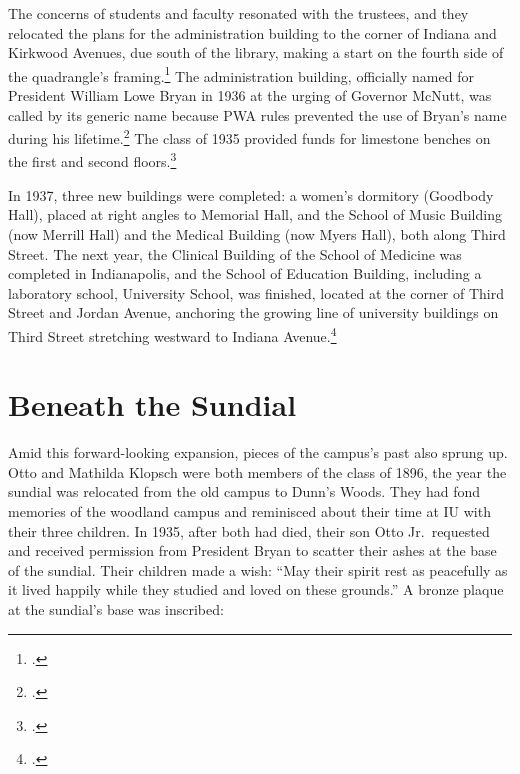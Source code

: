 \documentclass[
  american,
  letterpaper,
]{scrreprt}
\begin{document}
The concerns of students and faculty resonated with the trustees, and
they relocated the plans for the administration building to the corner
of Indiana and Kirkwood Avenues, due south of the library, making a
start on the fourth side of the quadrangle's framing.\footnote{.}
The administration building, officially named for President William Lowe
Bryan in 1936 at the urging of Governor McNutt, was called by its
generic name because PWA rules prevented the use of Bryan's name during
his lifetime.\footnote{.} The class of 1935 provided funds for
limestone benches on the first and second floors.\footnote{.}

In 1937, three new buildings were completed: a women's dormitory
(Goodbody Hall), placed at right angles to Memorial Hall, and the School
of Music Building (now Merrill Hall) and the Medical Building (now Myers
Hall), both along Third Street. The next year, the Clinical Building of
the School of Medicine was completed in Indianapolis, and the School of
Education Building, including a laboratory school, University School,
was finished, located at the corner of Third Street and Jordan Avenue,
anchoring the growing line of university buildings on Third Street
stretching westward to Indiana Avenue.\footnote{.}

\section{Beneath the Sundial}\label{beneath-the-sundial}

Amid this forward-looking expansion, pieces of the campus's past also
sprung up. Otto and Mathilda Klopsch were both members of the class of
1896, the year the sundial was relocated from the old campus to Dunn's
Woods. They had fond memories of the woodland campus and reminisced
about their time at IU with their three children. In 1935, after both
had died, their son Otto Jr.~requested and received permission from
President Bryan to scatter their ashes at the base of the sundial. Their
children made a wish: ``May their spirit rest as peacefully as it lived
happily while they studied and loved on these grounds.'' A bronze plaque
at the sundial's base was inscribed:
\end{document}
